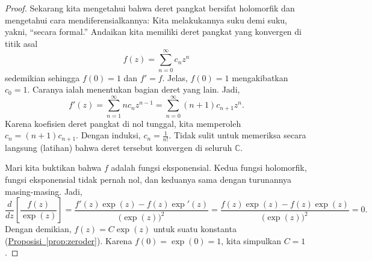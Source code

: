 \documentclass[12pt,openany]{book}
\newcommand{\C}{{\mathbb{C}}}
\newcommand{\myquote}[1]{``#1''}
\theoremstyle{plain}
\theoremstyle{remark}
\theoremstyle{definition}
\theoremstyle{exercise}
\theoremstyle{example}
\newcommand{\propref}[1]{\hyperref[#1]{Proposisi~\ref*{#1}}}
\begin{document}
\begin{proof}
Sekarang kita mengetahui bahwa deret pangkat bersifat holomorfik dan mengetahui cara
mendiferensialkannya: Kita melakukannya suku demi suku, yakni, \myquote{secara formal.}
Andaikan kita memiliki deret pangkat yang konvergen di titik asal
\begin{equation*}
f(z) = \sum_{n=0}^\infty c_n z^n
\end{equation*}
sedemikian sehingga $f(0)=1$ dan $f'=f$.
Jelas, $f(0)=1$ mengakibatkan $c_0 = 1$.
Caranya ialah menentukan bagian deret yang lain.
Jadi,
\begin{equation*}
f'(z) =
\sum_{n=1}^\infty n c_n z^{n-1} =
\sum_{n=0}^\infty (n+1) c_{n+1} z^{n} .
\end{equation*}
Karena koefisien deret pangkat di nol tunggal, kita memperoleh
$c_n = (n+1) c_{n+1}$.  Dengan induksi, $c_n = \frac{1}{n!}$.
Tidak sulit untuk memeriksa secara langsung (latihan)
bahwa deret tersebut konvergen di seluruh $\C$.

Mari kita buktikan bahwa $f$ adalah fungsi eksponensial.  Kedua fungsi
holomorfik, fungsi eksponensial tidak pernah nol, dan keduanya sama dengan
turunannya masing-masing.  Jadi,
\begin{equation*}
\frac{d}{dz} \left[ \frac{f(z)}{\exp(z)} \right]
=
\frac{f'(z)\exp(z) - f(z) \exp'(z)}{{\bigl(\exp(z)\bigr)}^2}
=
\frac{f(z)\exp(z) - f(z) \exp(z)}{{\bigl(\exp(z)\bigr)}^2}
= 0.
\end{equation*}
Dengan demikian, $f(z) = C \exp(z)$ untuk suatu konstanta (\propref{prop:zeroder}).
Karena $f(0) = \exp(0) = 1$,
kita simpulkan $C=1$.
\end{proof}
\end{document}
